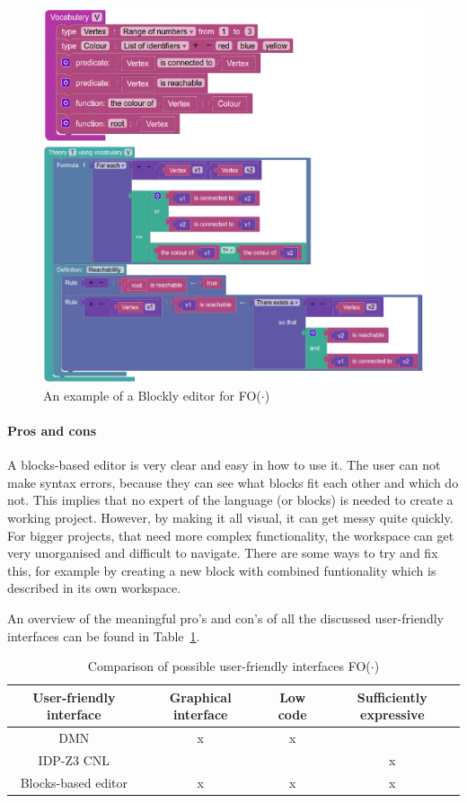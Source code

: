 \documentclass[11pt,a4paper]{report}
\newcommand{\fodot}{FO($\cdot$)\xspace}
\begin{document}
\begin{figure}
    \centering
    \includegraphics[width=0.8\linewidth]{images/blockly_IDP_example.png}
    \caption{An example of a Blockly editor for \fodot~\cite{IDPStructuredBlockbasedEditor}}
    \label{fig:blockly_IDP_example}
\end{figure}

\paragraph{Pros and cons}
A blocks-based editor is very clear and easy in how to use it. The user can not make syntax errors, because they can see what blocks fit each other and which do not. This implies that no expert of the language (or blocks) is needed to create a working project. However, by making it all visual, it can get messy quite quickly. For bigger projects, that need more complex functionality, the workspace can get very unorganised and difficult to navigate. There are some ways to try and fix this, for example by creating a new block with combined funtionality which is described in its own workspace. 

An overview of the meaningful pro's and con's of all the discussed user-friendly interfaces can be found in Table~\ref{tab:user-friendly_comparison}.

\begin{table}
    \centering
    \caption{Comparison of possible user-friendly interfaces \fodot}
    \label{tab:user-friendly_comparison}
    \begin{tabular}{|c|c|c|c|}
    \hline
    User-friendly interface & Graphical interface & Low code & Sufficiently expressive \\ \hline
    DMN & x & x &   \\ \hline
    IDP-Z3 CNL &  &  & x  \\ \hline
    Blocks-based editor & x & x & x \\ \hline
    \end{tabular}
\end{table}
\end{document}
